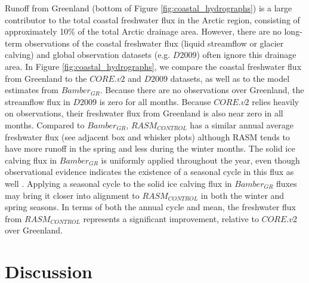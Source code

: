 Runoff from Greenland (bottom of Figure \ref{fig:coastal_hydrographs}) is a large contributor to the total coastal freshwater flux in the Arctic region, consisting of approximately 10\% of the total Arctic drainage area.
However, there are no long-term observations of the coastal freshwater flux (liquid streamflow or glacier calving) and global observation datasets (e.g. $D2009$) often ignore this drainage area.
In Figure \ref{fig:coastal_hydrographs}, we compare the coastal freshwater flux from Greenland to the $CORE.v2$ and $D2009$ datasets, as well as to the model estimates from $Bamber_{GR}$.
Because there are no observations over Greenland, the streamflow flux in $D2009$ is zero for all months.
Because $CORE.v2$ relies heavily on observations, their freshwater flux from Greenland is also near zero in all months.
Compared to $Bamber_{GR}$, $RASM_{CONTROL}$ has a similar annual average freshwater flux (see adjacent box and whisker plots) although RASM tends to have more runoff in the spring and less during the winter months.
The solid ice calving flux in $Bamber_{GR}$ is uniformly applied throughout the year, even though observational evidence indicates the existence of a seasonal cycle in this flux as well \citep[e.g.][]{Joughin_2008}.
Applying a seasonal cycle to the solid ice calving flux in $Bamber_{GR}$ fluxes may bring it closer into alignment to $RASM_{CONTROL}$ in both the winter and spring seasons.
In terms of both the annual cycle and mean, the freshwater flux from $RASM_{CONTROL}$ represents a significant improvement, relative to $CORE.v2$ over Greenland.

\section{Discussion}
\label{sec:discussion_ch4}

